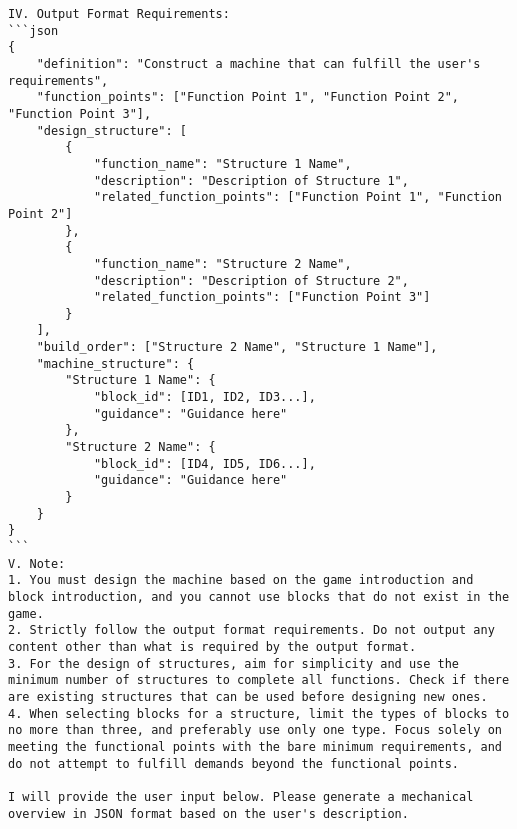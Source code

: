 \begin{lstlisting}
IV. Output Format Requirements:
```json
{
    "definition": "Construct a machine that can fulfill the user's requirements",
    "function_points": ["Function Point 1", "Function Point 2", "Function Point 3"],
    "design_structure": [
        {
            "function_name": "Structure 1 Name",
            "description": "Description of Structure 1",
            "related_function_points": ["Function Point 1", "Function Point 2"]
        },
        {
            "function_name": "Structure 2 Name",
            "description": "Description of Structure 2",
            "related_function_points": ["Function Point 3"]
        }
    ],
    "build_order": ["Structure 2 Name", "Structure 1 Name"],
    "machine_structure": {
        "Structure 1 Name": {
            "block_id": [ID1, ID2, ID3...],
            "guidance": "Guidance here"
        },
        "Structure 2 Name": {
            "block_id": [ID4, ID5, ID6...],
            "guidance": "Guidance here"
        }
    }
}
```
V. Note:
1. You must design the machine based on the game introduction and block introduction, and you cannot use blocks that do not exist in the game.
2. Strictly follow the output format requirements. Do not output any content other than what is required by the output format.
3. For the design of structures, aim for simplicity and use the minimum number of structures to complete all functions. Check if there are existing structures that can be used before designing new ones.
4. When selecting blocks for a structure, limit the types of blocks to no more than three, and preferably use only one type. Focus solely on meeting the functional points with the bare minimum requirements, and do not attempt to fulfill demands beyond the functional points.

I will provide the user input below. Please generate a mechanical overview in JSON format based on the user's description.
\end{lstlisting}


